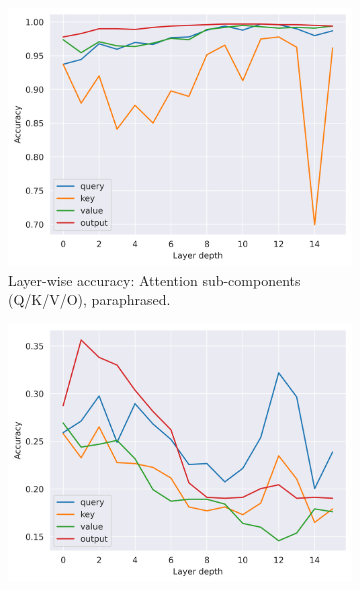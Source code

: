 \begin{figure}[htb]
\begin{subfigure}[h]{0.49\textwidth}
        \label{fig:accuracy_over_layer_depth_attention_vs_mlp_model_generated}
    \end{subfigure}
    \begin{subfigure}[h]{0.49\textwidth}
        \centering
        \includegraphics[width=\textwidth]{figures/results/paraphrased/attention_components.png}
        \caption{Layer-wise accuracy: Attention sub-components (Q/K/V/O), paraphrased.}      %
        \label{fig:accuracy_over_layer_depth_attention_paraphrased}
    \end{subfigure}
    \hfill
    \begin{subfigure}[h]{0.49\textwidth}
        \centering
        \includegraphics[width=\textwidth]{figures/results/model-generated/attention_components.png}

\end{subfigure}
\end{figure}
